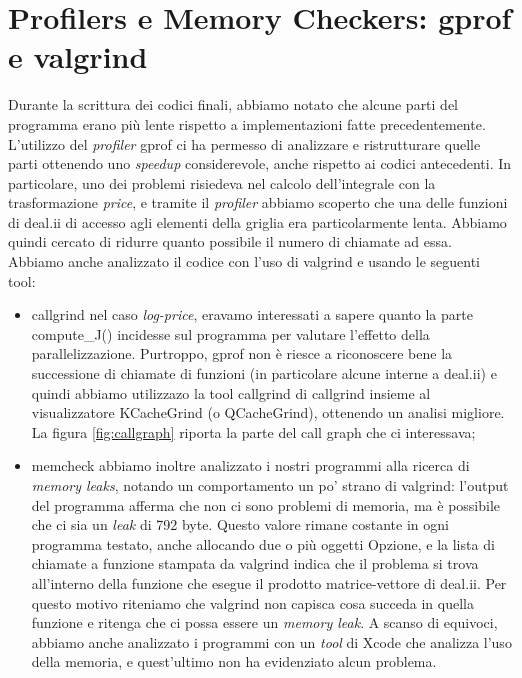 \documentclass[a4paper,10pt]{report}
\theoremstyle{plain}
\theoremstyle{definition}
\theoremstyle{remark}
\begin{document}
\section{Profilers e Memory Checkers: \textsf{gprof} e \textsf{valgrind}}
Durante la scrittura dei codici finali, abbiamo notato che alcune parti del programma erano più lente rispetto a implementazioni fatte precedentemente. L'utilizzo del \emph{profiler} \textsf{gprof} ci ha permesso di analizzare e ristrutturare quelle parti ottenendo uno \emph{speedup} considerevole, anche rispetto ai codici antecedenti. In particolare, uno dei problemi risiedeva nel calcolo dell'integrale con la trasformazione \emph{price}, e tramite il \emph{profiler} abbiamo scoperto che una delle funzioni di \textsf{deal.ii} di accesso agli elementi della griglia era particolarmente lenta. Abbiamo quindi cercato di ridurre quanto possibile il numero di chiamate ad essa.\\
Abbiamo anche analizzato il codice con l'uso di \textsf{valgrind} e usando le seguenti tool:
\begin{itemize}
 \item \textsf{callgrind} nel caso \emph{log-price}, eravamo interessati a sapere quanto la parte \textsf{compute\_J()} incidesse sul programma per valutare l'effetto della parallelizzazione. Purtroppo, \textsf{gprof} non è riesce a riconoscere bene la successione di chiamate di funzioni (in particolare alcune interne a deal.ii) e quindi abbiamo utilizzazo la tool \textsf{callgrind} di \textsf{callgrind} insieme al visualizzatore \textsf{KCacheGrind} (o \textsf{QCacheGrind}), ottenendo un analisi migliore. La figura \ref{fig:callgraph} riporta la parte del call graph che ci interessava;
 \item \textsf{memcheck} abbiamo inoltre analizzato i nostri programmi alla ricerca di \emph{memory leaks}, notando un comportamento un po' strano di \textsf{valgrind}: l'output del programma afferma che non ci sono problemi di memoria, ma \`e possibile che ci sia un \emph{leak} di 792 byte. Questo valore rimane costante in ogni programma testato, anche allocando due o pi\`u oggetti Opzione, e la lista di chiamate a funzione stampata da \textsf{valgrind} indica che il problema si trova all'interno della funzione che esegue il prodotto matrice-vettore di \textsf{deal.ii}. Per questo motivo riteniamo che \textsf{valgrind} non capisca cosa succeda in quella funzione e ritenga che ci possa essere un \emph{memory leak}. A scanso di equivoci, abbiamo anche analizzato i programmi con un \emph{tool} di Xcode che analizza l'uso della memoria, e quest'ultimo non ha evidenziato alcun problema.
\end{itemize}
\end{document}
